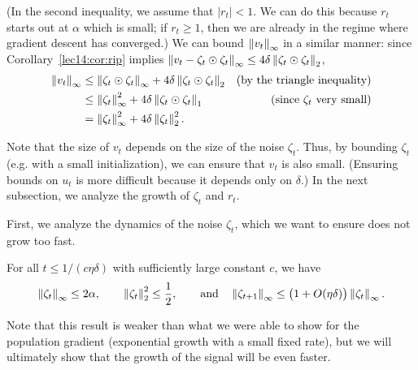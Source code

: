 (In the second inequality, we assume that $|r_t| < 1$. We can do this because $r_t$ starts out at $\alpha$ which is small; if $r_t \geq 1$, then we are already in the regime where gradient descent has converged.) We can bound $\left\|v_{t}\right\|_{\infty}$ in a similar manner: since Corollary~\ref{lec14:cor:rip} implies $\left\|v_t - \zeta_t \odot \zeta_t\right\|_\infty \leq 4\delta \left\|\zeta_{t} \odot \zeta_{t}\right\|_{2}$,
\begin{align}
    \left\|v_{t}\right\|_{\infty} &\leq \left\|\zeta_{t} \odot \zeta_{t}\right\|_{\infty} + 4\delta \left\|\zeta_{t} \odot \zeta_{t}\right\|_{2} &(\text{by the triangle inequality}) \\
    &\leq \left\|\zeta_{t}\right\|_{\infty}^{2} + 4\delta \left\|\zeta_{t} \odot \zeta_{t}\right\|_{1} &(\text{since } \zeta_t \text{ very small}) \\
    &= \left\|\zeta_{t}\right\|_{\infty}^{2} + 4\delta \left\|\zeta_{t}\right\|_{2}^{2}. \label{lec14:eqn:v-inf-norm}
\end{align}

Note that the size of $v_t$ depends on the size of the noise $\zeta_t$. Thus, by bounding $\zeta_t$ (e.g. with a small initialization), we can ensure that $v_t$ is also small. (Ensuring bounds on $u_t$ is more difficult because it depends only on $\delta$.) In the next subsection, we analyze the growth of $\zeta_t$ and $r_t$.


First, we analyze the dynamics of the noise $\zeta_t$, which we want to ensure does not grow too fast.

\begin{lemma} \label{lec14:lem:dynamics_noise}
    For all $t\leq 1 / (c\eta\delta)$ with sufficiently large constant $c$, we have
    \begin{equation} \label{lec14:eqn:dynamics_noise}
        \left\|\zeta_t\right\|_\infty \leq 2\alpha, \quad \quad \left\|\zeta_t\right\|_2^2 \leq \frac{1}{2}, \quad \quad \text{and} \quad \left\|\zeta_{t+1}\right\|_\infty \leq \big(1 + O(\eta\delta)\big) \left\|\zeta_t\right\|_\infty.
    \end{equation}
\end{lemma}
Note that this result is weaker than what we were able to show for the population gradient (exponential growth with a small fixed rate), but we will ultimately show that the growth of the signal will be even faster.

